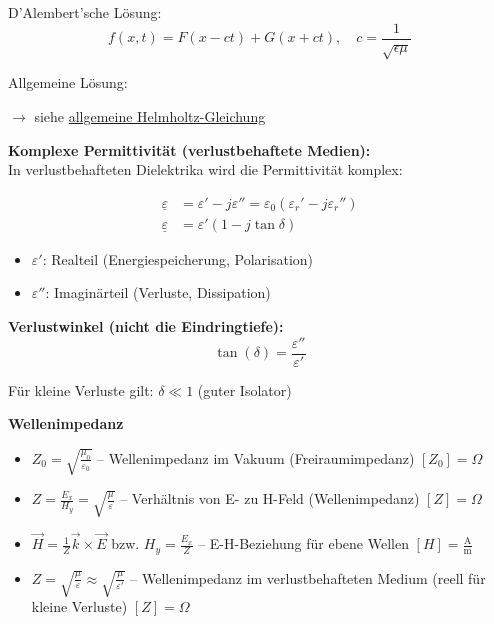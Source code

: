 D'Alembert'sche Lösung:
\begin{equation}
f(x, t) = F(x - ct) + G(x + ct), \quad c = \frac{1}{\sqrt{\epsilon\mu}}
\end{equation}

Allgemeine Lösung:

$\rightarrow$ siehe \hyperlink{helmholtz_allgemeine_loesung}{allgemeine Helmholtz-Gleichung}














\textbf{Komplexe Permittivität (verlustbehaftete Medien):}\\
In verlustbehafteten Dielektrika wird die Permittivität komplex:

\begin{align}
\underline{\varepsilon} &= \varepsilon' - j\varepsilon'' = \varepsilon_0(\varepsilon_r' - j\varepsilon_r'') \\
\underline{\varepsilon} &= \varepsilon'(1 - j\tan\delta)
\end{align}

\begin{itemize}
    \item $\varepsilon'$: Realteil (Energiespeicherung, Polarisation)
    \item $\varepsilon''$: Imaginärteil (Verluste, Dissipation)
\end{itemize}

\textbf{Verlustwinkel (nicht die Eindringtiefe):}
\begin{equation}
\tan(\delta) = \frac{\varepsilon''}{\varepsilon'}
\end{equation}

Für kleine Verluste gilt: $\delta \ll 1$ (guter Isolator)



\textbf{Wellenimpedanz}

\begin{itemize}
\item $Z_0 = \sqrt{\frac{\mu_0}{\varepsilon_0}}$ -- Wellenimpedanz im Vakuum (Freiraumimpedanz) \hfill $[Z_0] = \Omega$
\item $Z = \frac{E_x}{H_y} = \sqrt{\frac{\mu}{\varepsilon}}$ -- Verhältnis von E- zu H-Feld (Wellenimpedanz) \hfill $[Z] = \Omega$
\item $\vec{H} = \frac{1}{Z} \vec{k} \times \vec{E}$ bzw. $H_y = \frac{E_x}{Z}$ -- E-H-Beziehung für ebene Wellen \hfill $[H] = \frac{\text{A}}{\text{m}}$
\item $Z = \sqrt{\frac{\mu}{\varepsilon}} \approx \sqrt{\frac{\mu}{\varepsilon'}}$ -- Wellenimpedanz im verlustbehafteten Medium (reell für kleine Verluste) \hfill $[Z] = \Omega$
\end{itemize}


